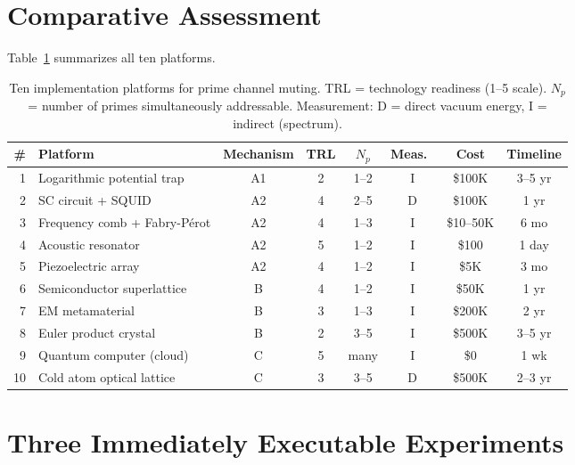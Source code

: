 \documentclass[11pt,a4paper]{article}
\begin{document}
\section{Comparative Assessment}
\label{sec:comparison}

Table~\ref{tab:comparison} summarizes all ten platforms.

\begin{table}[t]
\centering
\caption{Ten implementation platforms for prime channel muting.
  TRL = technology readiness (1--5 scale).
  $N_p$ = number of primes simultaneously addressable.
  Measurement: D = direct vacuum energy, I = indirect (spectrum).}
\label{tab:comparison}
\small
\begin{tabular}{@{}rlcccccc@{}}
\toprule
\# & Platform & Mechanism & TRL & $N_p$ & Meas.\ & Cost & Timeline \\
\midrule
1 & Logarithmic potential trap & A1 & 2 & 1--2 & I & \$100K & 3--5 yr \\
2 & SC circuit + SQUID~\cite{paper_A} & A2 & 4 & 2--5 & D & \$100K & 1 yr \\
3 & Frequency comb + Fabry-P\'erot & A2 & 4 & 1--3 & I & \$10--50K & 6 mo \\
4 & Acoustic resonator & A2 & 5 & 1--2 & I & \$100 & 1 day \\
5 & Piezoelectric array & A2 & 4 & 1--2 & I & \$5K & 3 mo \\
6 & Semiconductor superlattice & B & 4 & 1--2 & I & \$50K & 1 yr \\
7 & EM metamaterial & B & 3 & 1--3 & I & \$200K & 2 yr \\
8 & Euler product crystal & B & 2 & 3--5 & I & \$500K & 3--5 yr \\
9 & Quantum computer (cloud) & C & 5 & many & I & \$0 & 1 wk \\
10 & Cold atom optical lattice & C & 3 & 3--5 & D & \$500K & 2--3 yr \\
\bottomrule
\end{tabular}
\end{table}

\section{Three Immediately Executable Experiments}
\label{sec:immediate}
\end{document}
